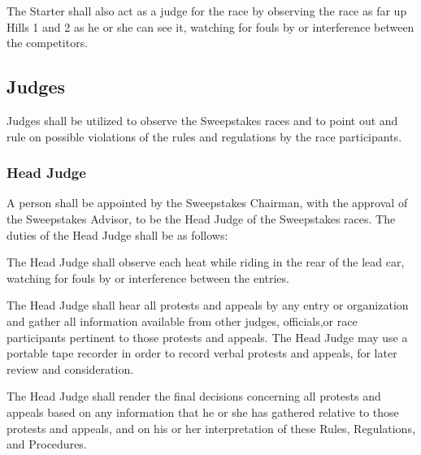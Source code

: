 The Starter shall also act as a judge for the race by observing the race as far up Hills 1 and 2 as he or she can see it, watching for fouls by or interference between the competitors.

\subsection{Judges}

Judges shall be utilized to observe the Sweepstakes races and to point out and rule on possible violations of the rules and regulations by the race participants.

\subsubsection{Head Judge}

A person shall be appointed by the Sweepstakes Chairman, with the approval of the Sweepstakes Advisor, to be the Head Judge of the Sweepstakes races. The duties of the Head Judge shall be as follows:

The Head Judge shall observe each heat while riding in the rear of the lead car, watching for fouls by or interference between the entries.

The Head Judge shall hear all protests and appeals by any entry or organization and gather all information available from other judges, officials,or race participants pertinent to those protests and appeals. The Head Judge may use a portable tape recorder in order to record verbal protests and appeals, for later review and consideration.

The Head Judge shall render the final decisions concerning all protests and appeals based on any information that he or she has gathered relative to those protests and appeals, and on his or her interpretation of these Rules, Regulations, and Procedures.

